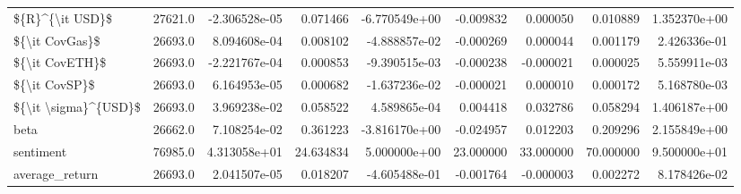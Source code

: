 \begin{tabular}{lrrrrrrrr}
\$\{R\}\textasciicircum \{\textbackslash it USD\}\$          &  27621.0 &  -2.306528e-05 &   0.071466 & -6.770549e+00 &  -0.009832 &   0.000050 &   0.010889 &   1.352370e+00 \\
\$\{\textbackslash it CovGas\}\$           &  26693.0 &   8.094608e-04 &   0.008102 & -4.888857e-02 &  -0.000269 &   0.000044 &   0.001179 &   2.426336e-01 \\
\$\{\textbackslash it CovETH\}\$           &  26693.0 &  -2.221767e-04 &   0.000853 & -9.390515e-03 &  -0.000238 &  -0.000021 &   0.000025 &   5.559911e-03 \\
\$\{\textbackslash it CovSP\}\$            &  26693.0 &   6.164953e-05 &   0.000682 & -1.637236e-02 &  -0.000021 &   0.000010 &   0.000172 &   5.168780e-03 \\
\$\{\textbackslash it \textbackslash sigma\}\textasciicircum \{USD\}\$     &  26693.0 &   3.969238e-02 &   0.058522 &  4.589865e-04 &   0.004418 &   0.032786 &   0.058294 &   1.406187e+00 \\
beta                     &  26662.0 &   7.108254e-02 &   0.361223 & -3.816170e+00 &  -0.024957 &   0.012203 &   0.209296 &   2.155849e+00 \\
sentiment                &  76985.0 &   4.313058e+01 &  24.634834 &  5.000000e+00 &  23.000000 &  33.000000 &  70.000000 &   9.500000e+01 \\
average\_return           &  26693.0 &   2.041507e-05 &   0.018207 & -4.605488e-01 &  -0.001764 &  -0.000003 &   0.002272 &   8.178426e-02 \\
\bottomrule
\end{tabular}
